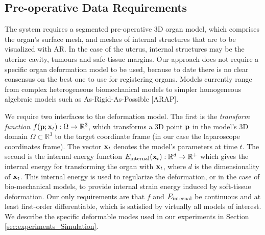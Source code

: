\subsection{Pre-operative Data Requirements}
\label{sec:inputModels}
The system requires a segmented pre-operative 3D organ model, which comprises the organ's surface mesh, and meshes of internal structures that are to be visualized with AR.
In the case of the uterus, internal structures may be the uterine cavity, tumours and safe-tissue margins. %
Our approach does not require a specific organ deformation model to be used, because to date there is no clear consensus on the best one to use for registering organs. Models currently range from complex heterogeneous biomechanical models to simpler homogeneous algebraic models such as As-Rigid-As-Possible [ARAP]. 

We require two interfaces to the deformation model. The first is the \emph{transform function} $f(\mathbf{p};\mathbf{x}_t): \Omega\rightarrow \mathbb{R}^3$, which transforms a 3D point $\mathbf{p}$ in the model's 3D domain $\Omega\subset \mathbb{R}^3$ to the target coordinate frame (in our case the laparoscope coordinates frame). The vector $\mathbf{x}_t$ denotes the model's parameters at time $t$. %
The second is the internal energy function $E_{\text{internal}}(\mathbf{x}_{t}):\mathbb{R}^{d}\rightarrow\mathbb{R}^{+}$ which gives the internal energy for transforming the organ with $\mathbf{x}_t$, where $d$ is the dimensionality of $\mathbf{x}_{t}$. This internal energy is used to regularize the deformation, or in the case of bio-mechanical models, to provide internal strain energy induced by soft-tissue deformation.
Our only requirements are that $f$ and $E_{\text{internal}}$ be continuous and at least first-order differentiable, which is satisfied by virtually all models of interest. We describe the specific deformable modes used in our experiments in Section \ref{sec:experiments_Simulation}.
 
